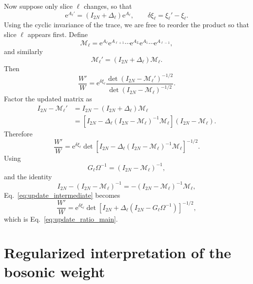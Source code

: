 \documentclass[twocolumn,aps,prb,10pt,amsmath,amssymb,amsthm,superscriptaddress]{revtex4-2}
\newcommand{\ee}{\mathrm{e}}
\newcommand{\mc}[1]{\mathcal{#1}}
\theoremstyle{remark}
\begin{document}
Now suppose only slice $\ell$ changes, so that
\begin{equation}
    \ee^{A_\ell'} = (I_{2N}+\Delta_\ell)\ee^{A_\ell},
    \qquad
    \delta\xi_\ell = \xi_\ell'-\xi_\ell.
\end{equation}
Using the cyclic invariance of the trace, we are free to reorder the product so that slice $\ell$ appears first. Define
\begin{equation}
    \mc M_\ell = \ee^{A_\ell}\ee^{A_{\ell+1}}\cdots\ee^{A_L}\ee^{A_1}\cdots\ee^{A_{\ell-1}},
\end{equation}
and similarly
\begin{equation}
    \mc M_\ell' = (I_{2N}+\Delta_\ell)\mc M_\ell.
\end{equation}
Then
\begin{equation}
    \frac{W'}{W}
    = \ee^{\delta\xi_\ell}
      \frac{\det(I_{2N}-\mc M_\ell')^{-1/2}}{\det(I_{2N}-\mc M_\ell)^{-1/2}}.
\end{equation}
Factor the updated matrix as
\begin{equation}
\begin{aligned}
    I_{2N}-\mc M_\ell'
    &= I_{2N}-(I_{2N}+\Delta_\ell)\mc M_\ell \\
    &= \left[I_{2N}-\Delta_\ell(I_{2N}-\mc M_\ell)^{-1}\mc M_\ell\right]
       (I_{2N}-\mc M_\ell).
\end{aligned}
\end{equation}
Therefore
\begin{equation}
    \frac{W'}{W}
    = \ee^{\delta\xi_\ell}
      \det\left[I_{2N}-\Delta_\ell(I_{2N}-\mc M_\ell)^{-1}\mc M_\ell\right]^{-1/2}.
    \label{eq:update_intermediate}
\end{equation}
Using
\begin{equation}
    G_\ell\Omega^{-1} = (I_{2N}-\mc M_\ell)^{-1},
\end{equation}
and the identity
\begin{equation}
    I_{2N}-(I_{2N}-\mc M_\ell)^{-1} = -(I_{2N}-\mc M_\ell)^{-1}\mc M_\ell,
\end{equation}
Eq.~\eqref{eq:update_intermediate} becomes
\begin{equation}
    \frac{W'}{W}
    = \ee^{\delta\xi_\ell}
      \det\left[I_{2N}+\Delta_\ell\left(I_{2N}-G_\ell\Omega^{-1}\right)\right]^{-1/2},
\end{equation}
which is Eq.~\eqref{eq:update_ratio_main}.

\section{Regularized interpretation of the bosonic weight}
\label{app:regularization}
\end{document}

